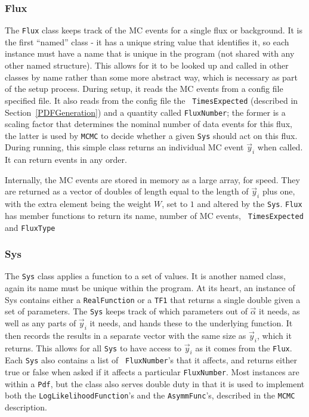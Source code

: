 \subsubsection{Flux}
The {\tt Flux} class keeps track of the MC events for a single flux or
background.  It is the first ``named'' class - it has a unique string
value that identifies it, so each instance must have a name that is
unique in the program (not shared with any other named structure).
This allows for it to be looked up and called in other classes by name
rather than some more abstract way, which is necessary as part of the
setup process.  During setup, it reads the MC events from a config
file specified file.  It also reads from the config file the {\tt
  TimesExpected} (described in \mbox{Section \ref{PDFGeneration}}) and
a quantity called {\tt FluxNumber}; the former is a scaling factor
that determines the nominal number of data events for this flux, the
latter is used by {\tt MCMC} to decide whether a given {\tt Sys}
should act on this flux. During running, this simple class returns an
individual MC event $\vec{y}_i$ when called.  It can return events in
any order.

Internally, the MC events are stored in memory as a large array, for
speed.  They are returned as a vector of doubles of length equal to
the length of $\vec{y}_i$ plus one, with the extra element being the
weight $W$, set to $1$ and altered by the {\tt Sys}.  {\tt Flux} has
member functions to return its name, number of MC events, {\tt
  TimesExpected} and {\tt FluxType}

\subsubsection{Sys}
The {\tt Sys} class applies a function to a set of values.  It is
another named class, again its name must be unique within the program.
At its heart, an instance of Sys contains either a {\tt RealFunction}
or a {\tt TF1} that returns a single double given a set of parameters.
The {\tt Sys} keeps track of which parameters out of $\vec{\alpha}$ it
needs, as well as any parts of $\vec{y}_i$ it needs, and hands these
to the underlying function.  It then records the results in a separate
vector with the same size as $\vec{y}_i$, which it returns.  This
allows for all {\tt Sys} to have access to $\vec{y}_i$ as it comes
from the {\tt Flux}.  Each {\tt Sys} also contains a list of {\tt
  FluxNumber}'s that it affects, and returns either true or false when
asked if it affects a particular {\tt FluxNumber}.  Most instances are
within a {\tt Pdf}, but the class also serves double duty in that it
is used to implement both the {\tt LogLikelihoodFunction}'s and the
{\tt AsymmFunc}'s, described in the {\tt MCMC} description.

